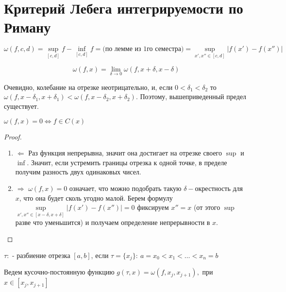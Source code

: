 \section{Критерий Лебега интегрируемости по Риману}

\begin{definition}
	\[ \omega(f, c, d) = \sup\limits_{[c, d]} f - \inf\limits_{[c, d]} f =  
    \text{(по лемме из 1го семестра)}  = \sup\limits_{x',x'' \in [c,d]} | f(x') - f(x'') |\]
\end{definition}

\begin{definition}
	\[ \omega(f, x) = \lim\limits_{\delta \rightarrow 0} \omega(f, x + \delta, x - \delta)\]
\end{definition}

Очевидно, колебание на отрезке неотрицательно, и, если $0 < \delta_1 < \delta_2$ 
то $\omega(f, x - \delta_1, x + \delta_1) < \omega(f, x - \delta_2, x + \delta_2)$.
Поэтому, вышеприведенный предел существует.

\begin{statement}
    $\omega(f, x) = 0 \Leftrightarrow f \in C(x)$
\end{statement}

\begin{proof}
	\begin{enumerate}
		\item $\Leftarrow$ Раз функция непрерывна, значит она достигает на отрезке своего $\sup$ и $\inf$. 
            Значит, если устремить границы отрезка к одной точке, в пределе получим разность двух одинаковых чисел.
		\item $\Rightarrow$ $\omega(f, x) = 0$ означает, что можно подобрать такую $\delta-$окрестность для $x$, 
            что она будет сколь угодно малой. Берем формулу $\sup\limits_{x',x'' \in [x - \delta,x + \delta]} | f(x') - f(x'') | = 0$ 
            фиксируем $x'' = x$ (от этого $\sup$ разве что уменьшится) и получаем определение непрерывности в $x$.
	\end{enumerate}
\end{proof}

\begin{definition}
$\tau:$ - разбиение отрезка $[a, b]$, если $\tau = \{x_j\}: \: a = x_0 < x_1 < \dots < x_n = b$
\end{definition}

Ведем кусочно-постоянную функцию $g(\tau, x) = \omega(f, x_j, x_{j + 1}),$ при $x \in [x_j, x_{j + 1}]$

